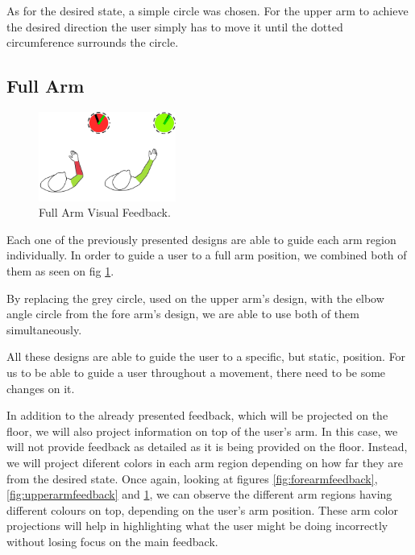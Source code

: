 
As for the desired state, a simple circle was chosen. 
For the upper arm to achieve the desired direction the user simply has to move it until the dotted circumference surrounds the circle.

\subsection{Full Arm}

\begin{figure}[!t]
    \begin{center}
        \includegraphics[width=0.4\textwidth]{imgs/fullarmfeedback.png}
    \end{center}
    \caption{Full Arm Visual Feedback.}
    \label{fig:fullarmfeedback}
\end{figure}

Each one of the previously presented designs are able to guide each arm region individually.
In order to guide a user to a full arm position, we combined both of them as seen on fig \ref{fig:fullarmfeedback}.

By replacing the grey circle, used on the upper arm's design, with the elbow angle circle from the fore arm's design, we are able to use both of them simultaneously. 

All these designs are able to guide the user to a specific, but static, position. For us to be able to guide a user throughout a movement, there need to be some changes on it.

In addition to the already presented feedback, which will be projected on the floor, we will also project information on top of the user's arm. 
In this case, we will not provide feedback as detailed as it is being provided on the floor. 
Instead, we will project diferent colors in each arm region depending on how far they are from the desired state. 
Once again, looking at figures \ref{fig:forearmfeedback}, \ref{fig:upperarmfeedback} and \ref{fig:fullarmfeedback}, we can observe the 
different arm regions having different colours on top, depending on the user's arm position.
These arm color projections will help in highlighting what the user might be doing incorrectly without losing focus on the main feedback.

